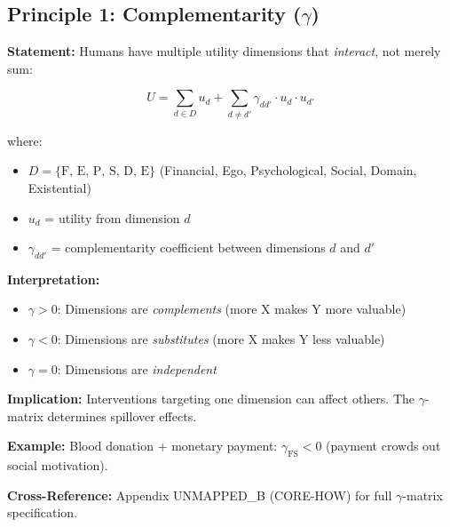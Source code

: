 \subsection{Principle 1: Complementarity ($\gamma$)}

\begin{tcolorbox}[colback=gray!5!white, colframe=gray!75!black,
    title=Axiom UNMAPPED_PR-1: Complementarity]

\textbf{Statement:} Humans have multiple utility dimensions that \textit{interact}, not merely sum:

\begin{equation}
U = \sum_{d \in D} u_d + \sum_{d \neq d'} \gamma_{dd'} \cdot u_d \cdot u_{d'}
\label{eq:pr-complementarity}
\end{equation}

where:
\begin{itemize}[nosep]
    \item $D = \{\text{F, E, P, S, D, E}\}$ (Financial, Ego, Psychological, Social, Domain, Existential)
    \item $u_d$ = utility from dimension $d$
    \item $\gamma_{dd'}$ = complementarity coefficient between dimensions $d$ and $d'$
\end{itemize}

\textbf{Interpretation:}
\begin{itemize}[nosep]
    \item $\gamma > 0$: Dimensions are \textit{complements} (more X makes Y more valuable)
    \item $\gamma < 0$: Dimensions are \textit{substitutes} (more X makes Y less valuable)
    \item $\gamma = 0$: Dimensions are \textit{independent}
\end{itemize}

\textbf{Implication:} Interventions targeting one dimension can affect others. The $\gamma$-matrix determines spillover effects.

\textbf{Example:} Blood donation + monetary payment: $\gamma_{\text{FS}} < 0$ (payment crowds out social motivation).

\textbf{Cross-Reference:} Appendix UNMAPPED_B (CORE-HOW) for full $\gamma$-matrix specification.

\end{tcolorbox}


